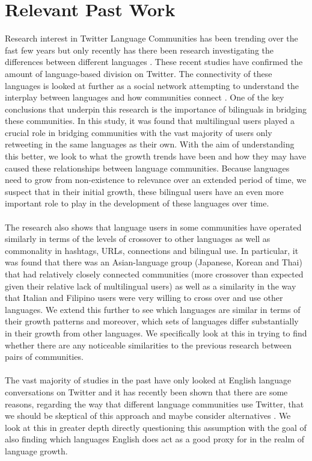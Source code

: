 \documentclass[12pt]{article}
\begin{document}
\section{Relevant Past Work}
 Research interest in Twitter Language Communities has been trending over the fast few years \cite{Delia, Eleta, Garcia, geographies, Goncalves, Gonzalez, Graham, Hecht, Kim, Kwak, Poblete} but only recently has there been research investigating the differences between different languages \cite{Halemain, Hong, Nguyen2}. These recent studies have confirmed the amount of language-based division on Twitter. The connectivity of these languages is looked at further as a social network attempting to understand the interplay between languages and how communities connect \cite{Halemain}. One of the key conclusions that underpin this research is the importance of bilinguals in bridging these communities. In this study, it was found that multilingual users played a crucial role in bridging communities with the vast majority of users only retweeting in the same languages as their own. With the aim of understanding this better, we look to what the growth trends have been and how they may have caused these relationships between language communities. Because languages need to grow from non-existence to relevance over an extended period of time, we suspect that in their initial growth, these bilingual users have an even more important role to play in the development of these languages over time.
\\\\ The research also shows that language users in some communities have operated similarly in terms of the levels of crossover to other languages as well as commonality in hashtags, URLs, connections \cite{Hong} and bilingual use. In particular, it was found that there was an Asian-language group (Japanese, Korean and Thai) that had relatively closely connected communities (more crossover than expected given their relative lack of multilingual users) as well as a similarity in the way that Italian and Filipino users were very willing to cross over and use other languages. We extend this further to see which languages are similar in terms of their growth patterns and moreover, which sets of languages differ substantially in their growth from other languages. We specifically look at this in trying to find whether there are any noticeable similarities to the previous research between pairs of communities.\\\\
The vast majority of studies in the past have only looked at English language conversations on Twitter \cite{HechtEnglish} and it has recently been shown that there are some reasons, regarding the way that different language communities use Twitter, that we should be skeptical of this approach and maybe consider alternatives \cite{Garcia, Halemain, Hong}. We look at this in greater depth directly questioning this assumption with the goal of also finding which languages English does act as a good proxy for in the realm of language growth.\\\\
\end{document}
